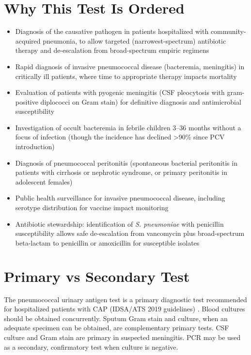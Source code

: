 \section*{Why This Test Is Ordered}
\begin{itemize}
  \item Diagnosis of the causative pathogen in patients hospitalized with community-acquired pneumonia, to allow targeted (narrowest-spectrum) antibiotic therapy and de-escalation from broad-spectrum empiric regimens
  \item Rapid diagnosis of invasive pneumococcal disease (bacteremia, meningitis) in critically ill patients, where time to appropriate therapy impacts mortality
  \item Evaluation of patients with pyogenic meningitis (CSF pleocytosis with gram-positive diplococci on Gram stain) for definitive diagnosis and antimicrobial susceptibility
  \item Investigation of occult bacteremia in febrile children 3--36 months without a focus of infection (though the incidence has declined >90\% since PCV introduction)
  \item Diagnosis of pneumococcal peritonitis (spontaneous bacterial peritonitis in patients with cirrhosis or nephrotic syndrome, or primary peritonitis in adolescent females)
  \item Public health surveillance for invasive pneumococcal disease, including serotype distribution for vaccine impact monitoring
  \item Antibiotic stewardship: identification of \textit{S. pneumoniae} with penicillin susceptibility allows safe de-escalation from vancomycin plus broad-spectrum beta-lactam to penicillin or amoxicillin for susceptible isolates
\end{itemize}

\section*{Primary vs Secondary Test}
The pneumococcal urinary antigen test is a primary diagnostic test recommended for hospitalized patients with CAP (IDSA/ATS 2019 guidelines) \cite{metlay2019diagnosis}. Blood cultures should be obtained concurrently. Sputum Gram stain and culture, when an adequate specimen can be obtained, are complementary primary tests. CSF culture and Gram stain are primary in suspected meningitis. PCR may be used as a secondary, confirmatory test when culture is negative.

